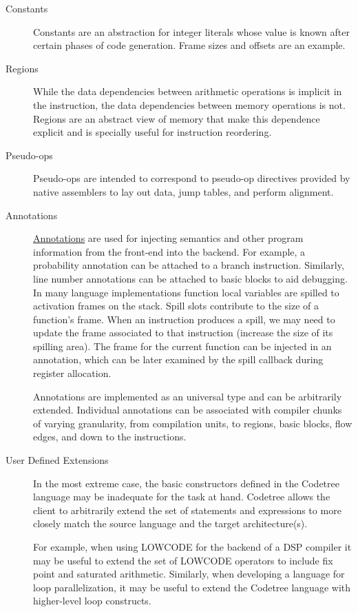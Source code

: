   \begin{description} 
    \item[Constants] Constants are an
    abstraction for integer literals whose value is known after
    certain phases of code generation. Frame sizes and offsets are an
    example.  
    \item[Regions] While the data
    dependencies between arithmetic operations is implicit in the
    instruction, the data dependencies between memory operations is
    not. Regions are an abstract view of memory that make this
    dependence explicit and is specially useful for instruction
    reordering. 

    \item[Pseudo-ops] Pseudo-ops are
    intended to correspond to pseudo-op directives provided by native
    assemblers to lay out data, jump tables, and perform alignment.

    \item[Annotations]
    \href{annotations.html}{Annotations} are used
    for injecting semantics and other program information from the front-end 
    into the backend.  For example, a probability annotation can be
    attached to a branch instruction.  Similarly, line number annotations
    can be attached to basic blocks to aid debugging.   
    In many language implementations function local variables are
    spilled to activation frames on the stack. Spill slots contribute
    to the size of a function's frame. When an instruction produces a
    spill, we may need to update the frame associated to that
    instruction (increase the size of its spilling area). The frame
    for the current function can be injected in an annotation, which
    can be later examined by the spill callback during register allocation. 

     Annotations are
    implemented as an universal type and can be arbitrarily extended.
    Individual annotations can be associated
    with compiler chunks of varying granularity, 
    from compilation units, to regions, basic blocks, flow edges,
    and down to the instructions.


    \item[User Defined Extensions]
    In the most extreme case, the basic constructors defined in the Codetree
    language may be inadequate for the task at hand.  
    Codetree allows the client to arbitrarily extend
    the set of statements and expressions to more closely match the
    source language and the target architecture(s). 
    
     For example, when using LOWCODE for the backend of a DSP compiler 
     it may be useful to extend the set of LOWCODE operators to include 
     fix point and saturated arithmetic.  
     Similarly, when developing a language for loop parallelization, it may
     be useful to extend the Codetree language with higher-level loop 
     constructs.
  \end{description} 

